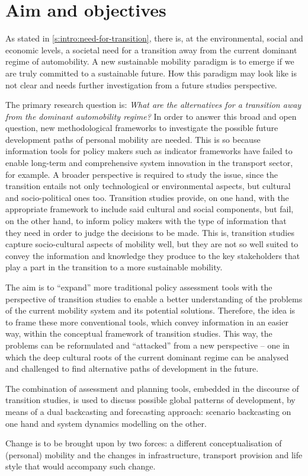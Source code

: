 \section{Aim and objectives}
\label{s:intro:aim-objectives}

As stated in \autoref{s:intro:need-for-transition}, there is, at the environmental, social and economic levels, a societal need for a transition away from the current dominant regime of automobility. A new sustainable mobility paradigm is to emerge if we are truly committed to a sustainable future. How this paradigm may look like is not clear and needs further investigation from a future studies perspective.

The primary research question is: \textit{What are the alternatives for a transition away from the dominant automobility regime?} In order to answer this broad and open question, new methodological frameworks to investigate the possible future development paths of personal mobility are needed. This is so because information tools for policy makers such as indicator frameworks have failed to enable long-term and comprehensive system innovation in the transport sector, for example. A broader perspective is required to study the issue, since the transition entails not only technological or environmental aspects, but cultural and socio-political ones too. Transition studies provide, on one hand, with the appropriate framework to include said cultural and social components, but fail, on the other hand, to inform policy makers with the type of information that they need in order to judge the decisions to be made. This is, transition studies capture socio-cultural aspects of mobility well, but they are not so well suited to convey the information and knowledge they produce to the key stakeholders that play a part in the transition to a more sustainable mobility.

The aim is to ``expand'' more traditional policy assessment tools with the perspective of transition studies to enable a better understanding of the problems of the current mobility system and its potential solutions. Therefore, the idea is to frame these more conventional tools, which convey information in an easier way, within the conceptual framework of transition studies. This way, the problems can be reformulated and ``attacked'' from a new perspective -- one in which the deep cultural roots of the current dominant regime can be analysed and challenged to find alternative paths of development in the future.

The combination of assessment and planning tools, embedded in the discourse of transition studies, is used to discuss possible global patterns of development, by means of a dual backcasting and forecasting approach: scenario backcasting on one hand and system dynamics modelling on the other.

Change is to be brought upon by two forces: a different conceptualisation of (personal) mobility and the changes in infrastructure, transport provision and life style that would accompany such change.